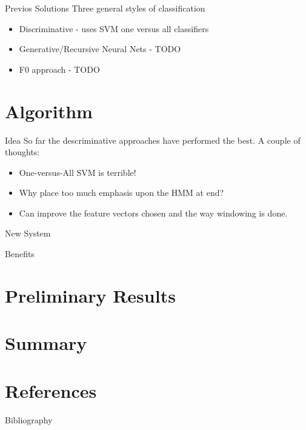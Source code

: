 \documentclass{beamer}
\begin{document}
\begin{frame}{Previos Solutions}
Three general styles of classification
\begin{itemize}
\item Discriminative - uses SVM one versus all classifiers
\item Generative/Recursive Neural Nets - TODO
\item F0 approach - TODO
\end{itemize}
\end{frame}

\section{Algorithm}
\begin{frame}{Idea}
So far the descriminative approaches have performed the best.
\pause
A couple of thoughts:
\begin{itemize}
\item One-versus-All SVM is terrible!
\item Why place too much emphasis upon the HMM at end?
\item Can improve the feature vectors chosen and the way windowing is done.
\end{itemize}
\end{frame}


\begin{frame}{New System}
\end{frame}
\begin{frame}{Benefits}
\end{frame}

\section{Preliminary Results}
\begin{frame}
\end{frame}

\section{Summary}
\begin{frame}
\end{frame}

\section{References}
\begin{frame}{Bibliography}

\nocite{*}

\end{frame}
\end{document}
